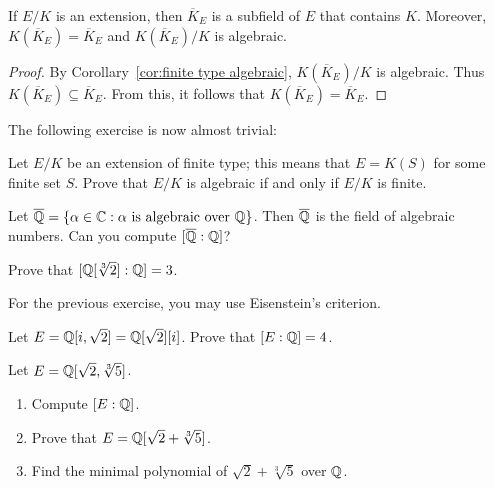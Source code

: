 \begin{corollary}
	If $E/K$ is  an extension, then $\overline{K}_E$ 
	is a subfield of $E$ that contains $K$. Moreover, 
	$K(\overline{K}_E)=\overline{K}_E$ and 
        $K(\overline{K}_E)/K$ is algebraic. 
\end{corollary}	

\begin{proof}
    By Corollary~\ref{cor:finite type algebraic}, $K(\overline{K}_E)/K$ is algebraic. 
    Thus $K(\overline{K}_E)\subseteq\overline{K}_E$. From this, it follows that
    $K(\overline{K}_E)=\overline{K}_E$. 
\end{proof}

The following exercise is now almost trivial:

\begin{exercise}
\label{xca:finite type}
    Let $E/K$ be an extension of finite type; this means 
    that  
    $E=K(S)$ for some finite
    set $S$.  
    Prove that $E/K$ is algebraic if and only if $E/K$ 
    is finite. 
\end{exercise}

Let $\overline{\mathbb{Q}}=\{\alpha\in\mathbb{C}:\alpha\text{ is algebraic over }\mathbb{Q}\}$. 
Then $\overline{\mathbb{Q}}$ is the field of algebraic numbers. 
Can you compute $[\overline{\mathbb{Q}}:\mathbb{Q}]$?

\begin{exercise}
\label{xca:degree of sqrt[3]2}
    Prove that $[\mathbb{Q}[\sqrt[3]{2}]:\mathbb{Q}]=3$. 
\end{exercise}

For the previous exercise, you may use Eisenstein's criterion. 

\begin{exercise}
\label{xca:Q(i,sqrt2)}
    Let $E=\mathbb{Q}[i,\sqrt{2}]=\mathbb{Q}[\sqrt{2}][i]$. Prove that $[E:\mathbb{Q}]=4$.  
\end{exercise}

\begin{exercise}
\label{xca:Q(sqrt2,sqrt[3]5)}
    Let $E=\mathbb{Q}[\sqrt{2},\sqrt[3]{5}]$. 
    \begin{enumerate}
        \item Compute $[E:\mathbb{Q}]$.
        \item Prove that $E=\mathbb{Q}[\sqrt{2}+\sqrt[3]{5}]$.
        \item Find the minimal polynomial of $\sqrt{2}+\sqrt[3]{5}$ over $\mathbb{Q}$. 
    \end{enumerate}
\end{exercise}

